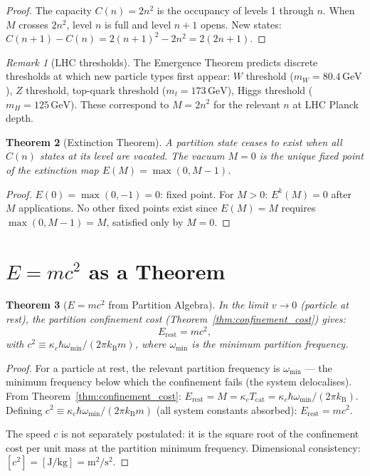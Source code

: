 \documentclass[twocolumn,10pt,a4paper]{article}
\theoremstyle{thmstyle}
\newtheorem{theorem}{Theorem}[section]
\theoremstyle{definition}
\theoremstyle{remark}
\newtheorem{remark}[theorem]{Remark}
\newcommand{\kB}{k_{\mathrm{B}}}
\newcommand{\Tcat}{T_{\mathrm{cat}}}
\begin{document}
\begin{proof}
The capacity $C(n) = 2n^2$ is the occupancy of levels 1 through $n$.
When $M$ crosses $2n^2$, level $n$ is full and level $n+1$ opens.
New states: $C(n+1) - C(n) = 2(n+1)^2 - 2n^2 = 2(2n+1)$.
\end{proof}

\begin{remark}[LHC thresholds]
The Emergence Theorem predicts discrete thresholds at which new particle
types first appear: $W$ threshold ($m_W = 80.4\,\mathrm{GeV}$), $Z$
threshold, top-quark threshold ($m_t = 173\,\mathrm{GeV}$), Higgs threshold
($m_H = 125\,\mathrm{GeV}$). These correspond to $M = 2n^2$ for the
relevant $n$ at LHC Planck depth.
\end{remark}

\begin{theorem}[Extinction Theorem]
\label{thm:extinction}
A partition state ceases to exist when all $C(n)$ states at its level
are vacated. The vacuum $M = 0$ is the unique fixed point of the
extinction map $E(M) = \max(0, M-1)$.
\end{theorem}

\begin{proof}
$E(0) = \max(0,-1) = 0$: fixed point. For $M > 0$: $E^k(M) = 0$
after $M$ applications. No other fixed points exist since
$E(M) = M$ requires $\max(0,M-1) = M$, satisfied only by $M = 0$.
\end{proof}

\section{$E = mc^2$ as a Theorem}
\label{sec:emc2}

\begin{theorem}[$E = mc^2$ from Partition Algebra]
\label{thm:emc2}
In the limit $v \to 0$ (particle at rest), the partition confinement cost
(Theorem~\ref{thm:confinement_cost}) gives:
\begin{equation}
E_{\mathrm{rest}} = mc^2,
\label{eq:emc2}
\end{equation}
with $c^2 \equiv \kappa_c\hbar\omega_{\min}/(2\pi\kB m)$, where
$\omega_{\min}$ is the minimum partition frequency.
\end{theorem}

\begin{proof}
For a particle at rest, the relevant partition frequency is $\omega_{\min}$
--- the minimum frequency below which the confinement fails (the system
delocalises). From Theorem~\ref{thm:confinement_cost}:
$E_{\mathrm{rest}} = M = \kappa_c\Tcat = \kappa_c\hbar\omega_{\min}/(2\pi\kB)$.
Defining $c^2 \equiv \kappa_c\hbar\omega_{\min}/(2\pi\kB m)$ (all system
constants absorbed):
$E_{\mathrm{rest}} = mc^2$.

The speed $c$ is not separately postulated: it is the square root of the
confinement cost per unit mass at the partition minimum frequency.
Dimensional consistency: $[c^2] = [\mathrm{J}/\mathrm{kg}] = \mathrm{m}^2/\mathrm{s}^2$.
\end{proof}
\end{document}
